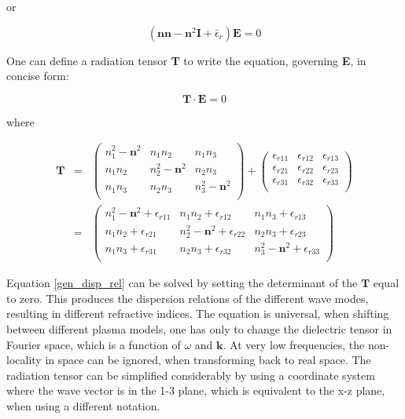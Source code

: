 \documentclass[a4paper,11pt]{thesis}
\begin{document}
or

\begin{equation}
    (\mathbf{n}\mathbf{n} - \mathbf{n}^2\mathbf{I}  +  \bar{\epsilon}_r ) \mathbf{E} =0
\end{equation}

One can define a radiation tensor \textbf{T} to write the equation,
governing \textbf{E}, in concise form:

\begin{equation}\label{gen_disp_rel}
    \mathbf{T}\cdot \mathbf{E}=0
\end{equation}

where

\begin{eqnarray}
    \mathbf{T}&=&\left(%
\begin{array}{ccc}
   n_1^2 -\mathbf{n}^2 &  n_1 n_2 & n_1 n_3 \\
n_1 n_2 & n_2^2 -\mathbf{n}^2 & n_2 n_3 \\
 n_1 n_3  &  n_2 n_3  &  n_3^2-\mathbf{n}^2 \\
\end{array}%
\right)+\left(%
 \begin{array}{ccc}
 \epsilon_{r11} & \epsilon_{r12} & \epsilon_{r13} \\
 \epsilon_{r21} & \epsilon_{r22} & \epsilon_{r23} \\
 \epsilon_{r31} & \epsilon_{r32} & \epsilon_{r33} \\
 \end{array}
  \right)\\
&=&
\left(%
\begin{array}{ccc}
   n_1^2 -\mathbf{n}^2 +\epsilon_{r11} &  n_1 n_2+\epsilon_{r12} & n_1 n_3 +\epsilon_{r13}\\
n_1 n_2 +\epsilon_{r21}& n_2^2 -\mathbf{n}^2+\epsilon_{r22} & n_2 n_3 +\epsilon_{r23}\\
 n_1 n_3 +\epsilon_{r31} &  n_2 n_3 +\epsilon_{r32} &  n_3^2-\mathbf{n}^2+\epsilon_{r33} \\
\end{array}%
\right)
\end{eqnarray}


Equation \ref{gen_disp_rel} can be solved by setting the determinant
of the $\mathbf{T}$ equal to zero. This produces the dispersion
relations of the different wave modes, resulting in different refractive indices. The equation is universal, when shifting
between different plasma models, one has only to change the
dielectric tensor in Fourier space, which is a function of $\omega$
and $\mathbf{k}$. At very low frequencies, the non-locality in space
can be ignored, when transforming back to real space. The radiation tensor can be simplified considerably by using a coordinate system where the wave vector is in the 1-3 plane, which is equivalent to the x-z plane, when using a different notation.
\end{document}
